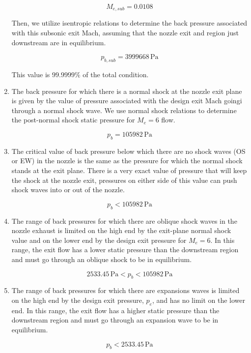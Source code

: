 \documentclass[../main.tex]{subfiles}
\begin{document}
\begin{enumerate}[label=(\alph*)]
    \[
        M_{e,sub} = 0.0108 
    \] 

    Then, we utilize isentropic relations to determine the back pressure associated with this subsonic exit Mach, assuming that the nozzle exit and region just downstream are in equilibrium.

    \[
        \boxed{p_{b,sub} = 3999668 \, \unit{\pascal}}
    \]

    This value is \(99.9999\%\) of the total condition.

    \item The back pressure for which there is a normal shock at the nozzle exit plane is given by the value of pressure associated with the design exit Mach goingi through a normal shock wave.
    We use normal shock relations to determine the post-normal shock static pressure for \(M_e=6\) flow.

    \[
        \boxed{p_{b} = 105982 \, \unit{\pascal}}
    \]  

    \item The critical value of back pressure below which there are no shock waves (OS or EW) in the nozzle is the same as the pressure for which the normal shock stands at the exit plane.
    There is a very exact value of pressure that will keep the shock at the nozzle exit, pressures on either side of this value can push shock waves into or out of the nozzle.    
    
    \[
        \boxed{p_{b} < 105982 \, \unit{\pascal}}
    \]

    \item The range of back pressures for which there are oblique shock waves in the nozzle exhaust is limited on the high end by the exit-plane normal shock value and on the lower end by the design exit pressure for \(M_e=6\).
    In this range, the exit flow has a lower static pressure than the downstream region and must go through an oblique shock to be in equilibrium.
    
    \[
        \boxed{2533.45\,\unit{\pascal} < p_{b} < 105982 \, \unit{\pascal}}
    \]

    \item The range of back pressures for which there are expansions waves is limited on the high end by the design exit pressure, \(p_e\), and has no limit on the lower end.
    In this range, the exit flow has a higher static pressure than the downstream region and must go through an expansion wave to be in equilibrium.

    \[
        \boxed{p_{b} < 2533.45\,\unit{\pascal}}
    \]


\end{enumerate}
\end{document}
